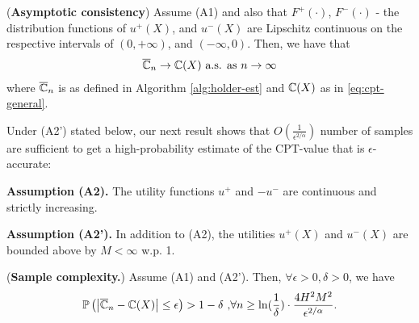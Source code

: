 \begin{proposition}(\textbf{Asymptotic consistency})
\label{prop:holder-asymptotic}
Assume (A1) and also that $F^+(\cdot)$, $F^-(\cdot)$ - the distribution functions of $u^+(X)$, and $u^-(X)$ 
are Lipschitz continuous 
on the respective intervals of $(0,+\infty)$, and 
$(-\infty, 0)$. Then, we have that
\begin{align}
\overline {\mathbb{C}}_n
\rightarrow
\mathbb{C}(X)
 \text{   a.s. as } n\rightarrow \infty
\end{align}
where $\overline {\mathbb{C}}_n$ is as defined in Algorithm \ref{alg:holder-est} and $\mathbb{C}(X)$ as in \eqref{eq:cpt-general}.
\end{proposition}
Under (A2') stated below, 
our next result shows that $O\left(\frac{1}{\epsilon^{2/\alpha}}\right)$ number of samples are sufficient to get a
high-probability estimate of the CPT-value that is $\epsilon$-accurate:

\textbf{Assumption (A2).}  The utility functions $u^+$ and $-u^-$ are continuous and strictly increasing.

\textbf{Assumption (A2').}  In addition to (A2), the utilities $u^+(X)$ and $u^-(X)$ are bounded above by $M<\infty$ w.p. 1.

\begin{proposition}(\textbf{Sample complexity.})
\label{prop:holder-dkw}
Assume (A1) and (A2'). Then, $\forall \epsilon >0, \delta >0$, we have
$$
\mathbb{P}\left( \left |\overline {\mathbb{C}}_n- \mathbb{C}(X) \right| \leq  \epsilon  \right) >1- \delta\text{     ,} \forall n \geq \ln(\frac{1}{\delta})\cdot 
\frac{4H^2 M^2}{\epsilon^{2/\alpha}}.$$
\end{proposition}
%
%

